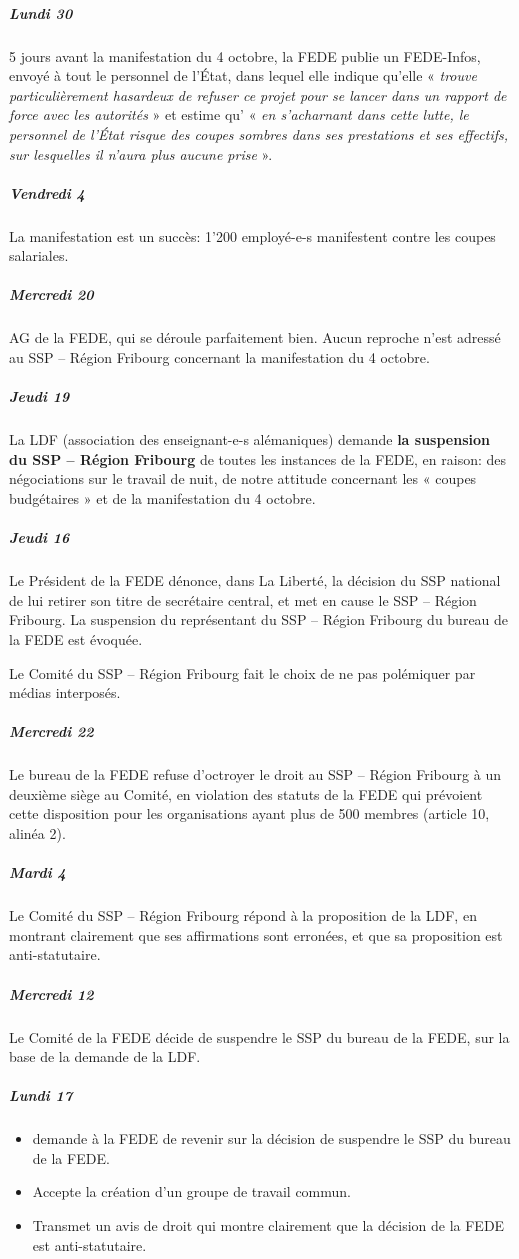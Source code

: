 \subparagraph{Lundi 30}%
5 jours avant la manifestation du 4 octobre, la FEDE publie un
FEDE-Infos, envoyé à tout le personnel de l'État, dans lequel elle indique qu'elle
« \emph{trouve particulièrement hasardeux de refuser ce projet pour se lancer dans un
rapport de force avec les autorités} » et estime qu' « \emph{en s'acharnant dans cette lutte, le
personnel de l'État risque des coupes sombres dans ses prestations et ses effectifs, sur
lesquelles il n'aura plus aucune prise} ».

\subparagraph{Vendredi 4}%
La manifestation est un succès: 1'200 employé-e-s manifestent
contre les coupes salariales.

\subparagraph{Mercredi 20}%
AG de la FEDE, qui se déroule parfaitement bien. Aucun
reproche n'est adressé au SSP – Région Fribourg concernant la manifestation du 4
octobre.

\subparagraph{Jeudi 19}%
La LDF (association des enseignant-e-s alémaniques)
demande \textbf{la suspension du SSP – Région Fribourg} de toutes les instances de la FEDE,
en raison: des négociations sur le travail de nuit, de notre attitude concernant les
« coupes budgétaires » et de la manifestation du 4 octobre.

\subparagraph{Jeudi 16}%
Le Président de la FEDE dénonce, dans La Liberté, la
décision du SSP national de lui retirer son titre de secrétaire central, et met en cause le
SSP – Région Fribourg. La suspension du représentant du SSP – Région Fribourg du
bureau de la FEDE est évoquée.

Le Comité du SSP – Région Fribourg fait le choix de ne pas polémiquer par médias
interposés.

\subparagraph{Mercredi 22}%
Le bureau de la FEDE refuse d'octroyer le droit au SSP –
Région Fribourg à un deuxième siège au Comité, en violation des statuts de la FEDE
qui prévoient cette disposition pour les organisations ayant plus de 500 membres
(article 10, alinéa 2).

\subparagraph{Mardi 4}%
Le Comité du SSP – Région Fribourg répond à la
proposition de la LDF, en montrant clairement que ses affirmations sont erronées, et
que sa proposition est anti-statutaire.

\subparagraph{Mercredi 12}%
Le Comité de la FEDE décide de suspendre le SSP du
bureau de la FEDE, sur la base de la demande de la LDF.

\subparagraph{Lundi 17}%
\begin{itemize}
	\item demande à la FEDE de revenir sur la décision de suspendre le SSP du bureau de la FEDE.
	\item Accepte la création d'un groupe de travail commun.
	\item Transmet un avis de droit qui montre clairement que la décision de la FEDE est anti-statutaire.
\end{itemize}

